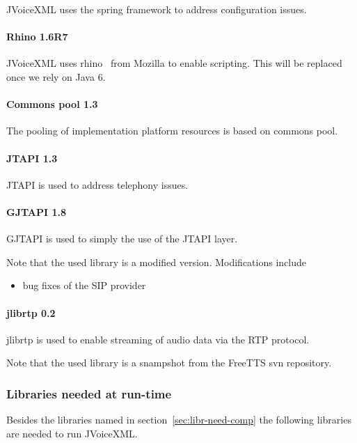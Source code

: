\documentclass[11pt,a4paper]{article}
\begin{document}
JVoiceXML uses the spring framework to address configuration
issues.

\paragraph{Rhino 1.6R7}

JVoiceXML uses rhino~\cite{rhino} from Mozilla to enable scripting.
This will be replaced once we rely on Java 6.

\paragraph{Commons pool 1.3}

The pooling of implementation platform resources is based on commons
pool.

\paragraph{JTAPI 1.3}

JTAPI is used to address telephony issues.

\paragraph{GJTAPI 1.8}

GJTAPI is used to simply the use of the JTAPI layer.

Note that the used library is a modified version. Modifications include
\begin{itemize}
\item bug fixes of the SIP provider
\end{itemize}

\paragraph{jlibrtp 0.2}

jlibrtp is used to enable streaming of audio data via the RTP protocol.

Note that the used library is a snampshot from the FreeTTS svn repository.

\subsubsection{Libraries needed at run-time}

Besides the libraries named in section~\ref{sec:libr-need-comp} the following
libraries are needed to run JVoiceXML.
\end{document}
